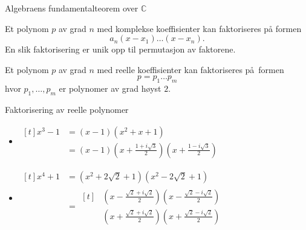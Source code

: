 \documentclass[norsk, handout]{beamer}
\theoremstyle{example}
\begin{document}
\begin{frame}{Algebraens fundamentalteorem over $\mathbb C$}
    \begin{theorem}
        Et polynom $p$ av grad $n$ med komplekse koeffisienter kan faktoriseres
        på formen
        \[
            a_n (x - x_1)\dots(x - x_n).
        \]
        En slik faktorisering er unik opp til permutasjon av faktorene.
    \end{theorem}
    \begin{corollary}
        Et polynom $p$ av grad $n$ med reelle koeffisienter kan
        faktoriseres på formen
        \[
            p = p_1\dots p_m
        \]
        hvor $p_1,\dots, p_m$ er polynomer av grad høyst $2$.
    \end{corollary}
\end{frame}

\begin{frame}{Faktorisering av reelle polynomer}
    \begin{example}
        \begin{itemize}
            \item $\begin{aligned}[t]
                    x^3 - 1
                    &= (x - 1)(x^2 + x + 1)
                    \\
                    &= (x - 1)\left(x + \frac{1 + i\sqrt 3} 2\right)\left(x + \frac {1 - i\sqrt 3} 2\right)\end{aligned}$
            \pause\item $\begin{aligned}[t]
                    x^4 + 1
                    &= (x^2 + 2\sqrt 2 + 1)(x^2 - 2\sqrt 2 + 1)\\
                    &=\begin{aligned}[t]
                        &\left(x - \frac {\sqrt 2 + i\sqrt 2}{2}\right)
                        \left(x - \frac {\sqrt 2 - i\sqrt 2}{2}\right)\\
                        &\left(x + \frac {\sqrt 2 + i\sqrt 2}{2}\right)
                        \left(x + \frac {\sqrt 2 - i\sqrt 2}{2}\right)
                    \end{aligned}
                \end{aligned}$
        \end{itemize}
    \end{example}
\end{frame}
\end{document}
